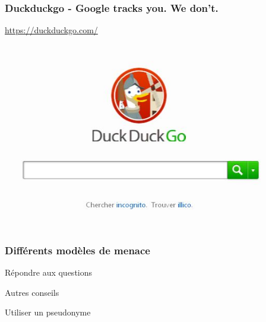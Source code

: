 \documentclass{beamer}
\begin{document}
\begin{frame}
\begin{center}
\frametitle{Duckduckgo - Google tracks you. We don't.}

\url{https://duckduckgo.com/}
\\
\includegraphics[scale=0.6] {./images/DuckDuckGo.jpg}
\end{center}
\end{frame}

\begin{frame}
\frametitle{Différents modèles de menace}
\begin{block}{Répondre aux questions}
\end{block}
\justifying{}
\end{frame}

\begin{frame}
\begin{center}
\Huge{Autres conseils }
\end{center}
\end{frame}

\begin{frame}
\begin{center}
\Huge{Utiliser un pseudonyme }
\end{center}
\end{frame}
\end{document}
